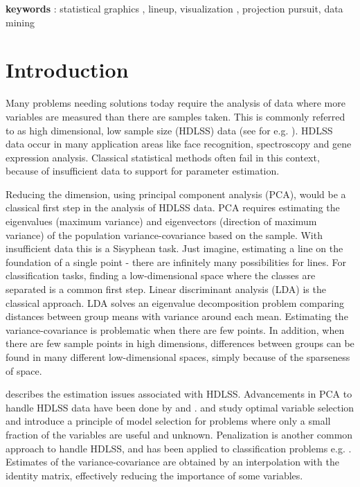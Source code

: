 \textbf{keywords} : statistical graphics , lineup, visualization , projection pursuit, data mining





\section{Introduction} 

Many problems needing solutions today require the analysis of data where more variables are measured than there are samples taken. This is commonly referred to as high dimensional, low sample size (HDLSS) data (see for e.g. \cite{hall:2005}).   
HDLSS data occur in many application areas like face recognition, spectroscopy  and gene expression analysis. Classical statistical methods often fail in this context, because of insufficient data to support for parameter estimation. 

Reducing the dimension, using principal component analysis (PCA), would be a classical first step in the analysis of HDLSS data. PCA requires estimating the eigenvalues (maximum variance) and eigenvectors (direction of maximum variance) of the population variance-covariance based on the sample. With insufficient data this is a Sisyphean task. Just imagine, estimating a line on the foundation of a single point - there are infinitely many possibilities for lines. For classification tasks, finding a low-dimensional space where the classes are separated is a common first step. Linear discriminant analysis (LDA) is the classical approach. LDA solves an eigenvalue decomposition problem comparing distances between group means with variance around each mean. Estimating the variance-covariance is problematic when there are few points. In addition, when there are few sample points in high dimensions, differences between groups can be found in many different low-dimensional spaces, simply because of the sparseness of space.

\cite{marron:2007} describes the estimation issues associated with HDLSS.  
Advancements in PCA to handle HDLSS data have been done by \cite{marron:2011} and \cite{yata:2010}. \cite{donoho:2009} and \cite{donoho:2008} study optimal variable selection and introduce a principle of model selection for problems where only a small fraction of the variables are useful and unknown. Penalization is another common approach to handle HDLSS, and has been applied to classification problems e.g. \citep{witten:2011, lee:2009}. Estimates of the variance-covariance are obtained by an interpolation with the identity matrix, effectively reducing the importance of some variables. 

